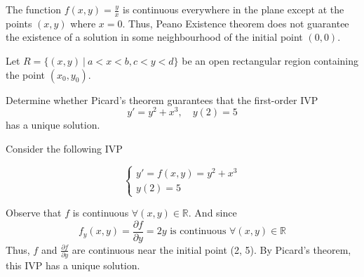 \begin{remark}
    The function $f(x,y) = \frac{y}{x}$ is continuous everywhere in the plane except
    at the points $(x, y)$ where $x=0$. Thus, Peano Existence theorem does not guarantee 
    the existence of a solution in some neighbourhood of the initial point $(0,0)$.
\end{remark}

\begin{theorem}
    Let $R = \{(x,y) \> | \> a < x < b, c < y < d\}$ be an open rectangular region 
    containing the point $(x_0, y_0)$.
\end{theorem}

\begin{example}
    Determine whether Picard's theorem guarantees that the first-order IVP
    \[
        y' = y^2 + x^3, \quad y(2) = 5
    \]
    has a unique solution.
\end{example}
\begin{solution}
    Consider the following IVP

    \[
        \begin{cases}
            y' = f(x,y) = y^2 + x^3\\
            y(2) = 5
        \end{cases}
    \]

    Observe that $f$ is continuous $\forall (x,y) \in \mathbb{R}$. And since
    \[
        f_y(x, y) = \frac{\partial f}{\partial y}=2y \text{ is continuous } \forall (x,y) \in \mathbb{R}
    \]
    Thus, $f$ and $\frac{\partial f}{\partial y}$ are continuous near the initial point (2, 5). 
    By Picard's theorem, this IVP has a unique solution.
\end{solution}